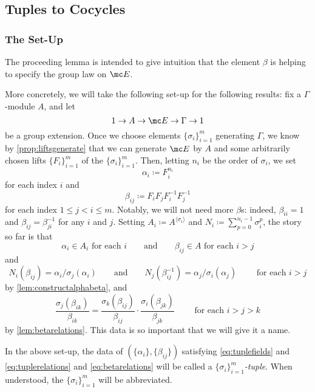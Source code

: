 \documentclass{article}
\numberwithin{equation}{section}
\begin{document}
\subsection{Tuples to Cocycles}
\subsubsection{The Set-Up}
The proceeding lemma is intended to give intuition that the element $\beta$ is helping to specify the group law on $\mc E$.

More concretely, we will take the following set-up for the following results: fix a $\Gamma$-module $A$, and let
\[1\to A\to\mc E\to\Gamma\to1\]
be a group extension. Once we choose elements $\{\sigma_i\}_{i=1}^m$ generating $\Gamma$, we know by \autoref{prop:liftsgenerate} that we can generate $\mc E$ by $A$ and some arbitrarily chosen lifts $\{F_i\}_{i=1}^m$ of the $\{\sigma_i\}_{i=1}^m$. Then, letting $n_i$ be the order of $\sigma_i$, we set
\[\alpha_i\coloneqq F_i^{n_i}\]
for each index $i$ and
\[\beta_{ij}\coloneqq F_iF_jF_i^{-1}F_j^{-1}\]
for each index $1\le j<i\le m$. Notably, we will not need more $\beta$s: indeed, $\beta_{ii}=1$ and $\beta_{ij}=\beta_{ji}^{-1}$ for any $i$ and $j$. Setting $A_i\coloneqq A^{\langle\sigma_i\rangle}$ and $N_i\coloneqq\sum_{p=0}^{n_i-1}\sigma_i^p$, the story so far is that
\begin{equation}
	\alpha_i\in A_i\text{ for each }i\qquad\text{and}\qquad\beta_{ij}\in A\text{ for each }i>j \label{eq:tuplefields}
\end{equation}
and
\begin{equation}
	N_i(\beta_{ij})=\alpha_i/\sigma_j(\alpha_i)\qquad\text{and}\qquad N_j(\beta_{ij}^{-1})=\alpha_j/\sigma_i(\alpha_j)\qquad\text{ for each }i>j \label{eq:tuplerelations}
\end{equation}
by \autoref{lem:constructalphabeta}, and
\begin{equation}
	\frac{\sigma_j(\beta_{ik})}{\beta_{ik}}=\frac{\sigma_k(\beta_{ij})}{\beta_{ij}}\cdot\frac{\sigma_i(\beta_{jk})}{\beta_{jk}}\qquad\text{ for each }i>j>k \label{eq:betarelations}
\end{equation}
by \autoref{lem:betarelations}. This data is so important that we will give it a name.
\begin{definition}
	In the above set-up, the data of $(\{\alpha_i\},\{\beta_{ij}\})$ satisfying \autoref{eq:tuplefields} and \autoref{eq:tuplerelations} and \autoref{eq:betarelations} will be called a \textit{$\{\sigma_i\}_{i=1}^m$-tuple}. When understood, the $\{\sigma_i\}_{i=1}^m$ will be abbreviated.
\end{definition}
\end{document}
